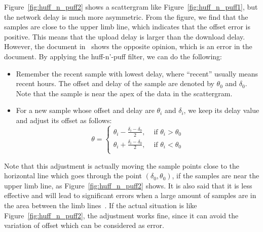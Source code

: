 Figure~\ref{fig:huff_n_puff2} shows a scattergram like
Figure~\ref{fig:huff_n_puff1}, but the network delay is much more asymmetric.
From the figure, we find that the samples are close to the upper limb line,
which indicates that the offset error is positive. This means that the upload
delay is larger than the download delay. However, the document
in~\cite{huff_n_puff} shows the opposite opinion, which is an error in the
document. By applying the huff-n'-puff filter, we can do the following:
\begin{itemize}
    \item 
        Remember the recent sample with lowest delay, where ``recent'' usually
        means recent hours. The offset and delay of the sample are denoted by 
        $\theta_0$ and $\delta_0$. Note that the sample is near the apex of the
        data in the scattergram.
    \item 
        For a new sample whose offset and delay are $\theta_i$ and
        $\delta_i$, we keep its delay value and adjust its offset as follows:
        \begin{equation}
            \theta = 
            \begin{cases}
                \displaystyle
                \theta_i - \frac{\delta_i - \delta_0}{2}, &\text{ if }\theta_i
                > \theta_0\\
                \displaystyle
                \theta_i + \frac{\delta_i - \delta_0}{2}, &\text{ if }\theta_i
                < \theta_0\\
            \end{cases}
            \label{eq:huff_n_puff}
        \end{equation}
\end{itemize}



Note that this adjustment is actually moving the sample points close to the
horizontal line which goes through the point $(\delta_0, \theta_0)$, if the
samples are near the upper limb line, as Figure~\ref{fig:huff_n_puff2} shows.
It is also said that it is less effective and will lead to significant errors
when a large amount of samples are in the area between the limb
lines~\cite{huff_n_puff}. If the actual situation is like
Figure~\ref{fig:huff_n_puff2}, the adjustment works fine, since it can avoid
the variation of offset which can be considered as error.



